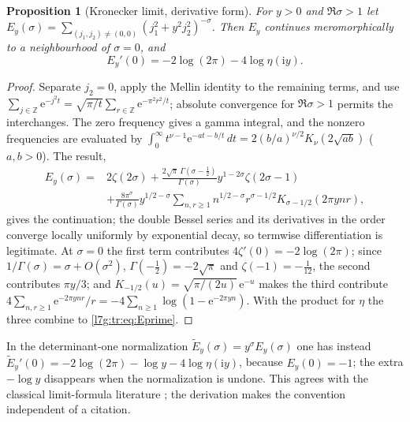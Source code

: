 \documentclass[11pt,letterpaper]{article}
\newtheorem{proposition}[theorem]{Proposition}
\theoremstyle{remark}\newtheorem{remark}[theorem]{Remark}
\newcommand{\ii}{\mathrm i}\newcommand{\ee}{\mathrm e}
\newcounter{l7gtrsavedeq}
\begin{document}
\begin{proposition}[Kronecker limit, derivative form]\label{l7g:tr:prop:kronecker}
For $y>0$ and $\Re\sigma>1$ let
$E_y(\sigma)=\sum_{(j_1,j_2)\ne(0,0)}(j_1^2+y^2j_2^2)^{-\sigma}$. Then $E_y$
continues meromorphically to a neighbourhood of $\sigma=0$, and
\begin{equation}\label{l7g:tr:eq:Eprime}
 E_y'(0)=-2\log(2\pi)-4\log\eta(\ii y).
\end{equation}
\end{proposition}
\begin{proof}
Separate $j_2=0$, apply the Mellin identity to the remaining terms, and use
$\sum_{j\in\mathbb Z}\ee^{-j^2t}=\sqrt{\pi/t}\sum_{r\in\mathbb Z}\ee^{-\pi^2r^2/t}$;
absolute convergence for $\Re\sigma>1$ permits the interchanges. The zero
frequency gives a gamma integral, and the nonzero frequencies are evaluated
by $\int_0^\infty t^{\nu-1}\ee^{-at-b/t}\,dt=2(b/a)^{\nu/2}K_\nu(2\sqrt{ab})$
($a,b>0$). The result,
\begin{equation}\label{l7g:tr:eq:bessel}
\begin{split}
 E_y(\sigma)={}&2\zeta(2\sigma)
 +\frac{2\sqrt\pi\,\Gamma(\sigma-\frac12)}{\Gamma(\sigma)}
   y^{1-2\sigma}\zeta(2\sigma-1)\\
 &+\frac{8\pi^\sigma}{\Gamma(\sigma)}y^{1/2-\sigma}
 \sum_{n,r\ge1}n^{1/2-\sigma}r^{\sigma-1/2}K_{\sigma-1/2}(2\pi ynr),
\end{split}
\end{equation}
gives the continuation; the double Bessel series and its derivatives in the
order converge locally uniformly by exponential decay, so termwise
differentiation is legitimate. At $\sigma=0$ the first term contributes
$4\zeta'(0)=-2\log(2\pi)$; since $1/\Gamma(\sigma)=\sigma+O(\sigma^2)$,
$\Gamma(-\frac12)=-2\sqrt\pi$ and $\zeta(-1)=-\frac1{12}$, the second
contributes $\pi y/3$; and $K_{-1/2}(u)=\sqrt{\pi/(2u)}\,\ee^{-u}$ makes the
third contribute
$4\sum_{n,r\ge1}\ee^{-2\pi ynr}/r=-4\sum_{n\ge1}\log(1-\ee^{-2\pi yn})$.
With the product for $\eta$ the three combine to \eqref{l7g:tr:eq:Eprime}.
\end{proof}
In the determinant-one normalization $\widetilde E_y(\sigma)=y^\sigma
E_y(\sigma)$ one has instead
$\widetilde E_y'(0)=-2\log(2\pi)-\log y-4\log\eta(\ii y)$, because
$E_y(0)=-1$; the extra $-\log y$ disappears when the normalization is
undone. This agrees with the classical limit-formula literature
\cite{l7g:tr:chamizo}; the derivation makes the convention independent of
a citation.
\end{document}
